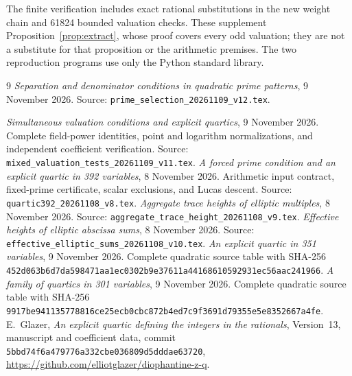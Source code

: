 \documentclass[11pt,a4paper]{article}
\theoremstyle{remark}\newtheorem{remark}[theorem]{Remark}
\begin{document}
The finite verification includes exact rational substitutions in the
new weight chain and 61824 bounded valuation checks. These supplement
Proposition~\ref{prop:extract}, whose proof covers every odd valuation;
they are not a substitute for that proposition or the arithmetic premises.
The two reproduction programs use only the Python standard library.

\begin{thebibliography}{9}
\emph{Separation and denominator conditions in quadratic prime patterns},
9 November 2026.
Source: \nolinkurl{prime_selection_20261109_v12.tex}.

\emph{Simultaneous valuation conditions and explicit quartics},
9 November 2026. Complete field-power identities, point and logarithm
normalizations, and independent coefficient verification.
Source: \nolinkurl{mixed_valuation_tests_20261109_v11.tex}.
\emph{A forced prime condition and an explicit quartic in 392 variables},
8 November 2026. Arithmetic input contract, fixed-prime certificate,
scalar exclusions, and Lucas descent.
Source: \nolinkurl{quartic392_20261108_v8.tex}.
\emph{Aggregate trace heights of elliptic multiples}, 8 November 2026.
Source: \nolinkurl{aggregate_trace_height_20261108_v9.tex}.
\emph{Effective heights of elliptic abscissa sums}, 8 November 2026.
Source: \nolinkurl{effective_elliptic_sums_20261108_v10.tex}.
\emph{An explicit quartic in 351 variables}, 9 November 2026.
Complete quadratic source table with SHA-256
\nolinkurl{452d063b6d7da598471aa1ec0302b9e37611a44168610592931ec56aac241966}.
\emph{A family of quartics in 301 variables}, 9 November 2026.
Complete quadratic source table with SHA-256
\nolinkurl{9917be941135778816ce25ecb0cbc872b4ed7c9f3691d79355e5e8352667a4fe}.
E.~Glazer, \emph{An explicit quartic defining the integers in the rationals},
Version~13, manuscript and coefficient data, commit
\nolinkurl{5bbd74f6a479776a332cbe036809d5dddae63720},
\url{https://github.com/elliotglazer/diophantine-z-q}.
\end{thebibliography}
\end{document}
